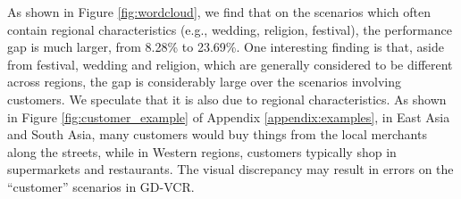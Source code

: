 \documentclass[11pt]{article}
\begin{document}
\begin{table*}[t]
\centering
{}
\caption{VisualBERT's accuracy (\%) on low-order and high-order cognitive QA pairs. ``Gap (West)'' denotes performance gap over the QA pairs of images from Western and non-Western regions. ``$|Low-High|$'' denotes the performance gap between low-order and high-order cognitive QA pairs from the same regions.}
    \label{tab:reasoning_level}
\end{table*}

As shown in Figure \ref{fig:wordcloud}, we find that on the scenarios which often contain regional characteristics (e.g., wedding, religion, festival), the performance gap is much larger, from 8.28\% to 23.69\%. 
One interesting finding is that, aside from festival, wedding and religion, which are generally considered to be different across regions, the gap is considerably large over the scenarios involving customers. 
We speculate that it is also due to regional characteristics. As shown in Figure \ref{fig:customer_example} of Appendix \ref{appendix:examples}, in East Asia and South Asia, many customers would buy things from the local merchants along the streets, while in Western regions, customers typically shop in supermarkets and restaurants. The visual discrepancy may result in errors on the ``customer'' scenarios in GD-VCR. 
\end{document}
